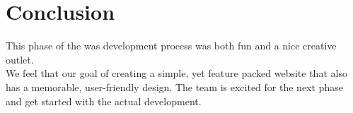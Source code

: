 \section{Conclusion}
This phase of the was development process was both fun and a nice creative outlet. \\

We feel that our goal of creating a simple, yet feature packed website that also has a memorable, user-friendly design. The team is excited for the next phase and get started with the actual development. \\

